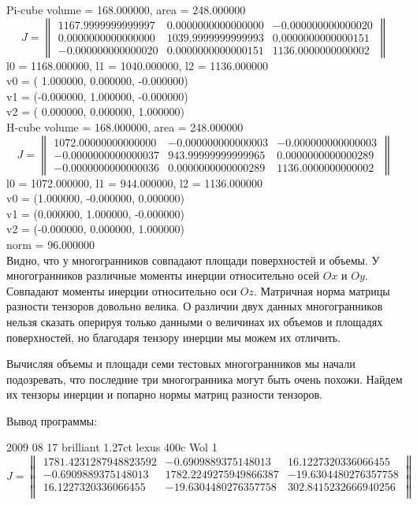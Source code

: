 \documentclass[a4paper,12pt, titlepage]{article}
\begin{document}
Pi-cube
volume = 168.000000, area = 248.000000
\[
J = 
\begin{Vmatrix}
1167.9999999999997	& 0.0000000000000000 &	-0.000000000000020	\\
0.0000000000000000	& 1039.9999999999993 &   0.0000000000000151	\\
-0.000000000000020	& 0.0000000000000151 &   1136.0000000000002	
\end{Vmatrix}
\]
l0 = 1168.000000, l1 = 1040.000000, l2 = 1136.000000\\
v0 = ( 1.000000,  0.000000, -0.000000)\\
v1 = (-0.000000,  1.000000, -0.000000)\\
v2 = ( 0.000000,  0.000000,  1.000000)\\


H-cube 
volume = 168.000000, area = 248.000000
\[
J = 
\begin{Vmatrix}
	1072.00000000000000	& -0.000000000000003 & -0.000000000000003	\\
	-0.0000000000000037	& 943.99999999999965 & 0.0000000000000289	\\
	-0.0000000000000036	& 0.0000000000000289 & 1136.0000000000002	
\end{Vmatrix}
\]
l0 = 1072.000000, l1 = 944.000000, l2 = 1136.000000\\
v0 = (1.000000, -0.000000, 0.000000)\\
v1 = (0.000000, 1.000000, -0.000000)\\
v2 = (-0.000000, 0.000000, 1.000000)\\

norm = 96.000000\\

Видно, что у многогранников совпадают площади поверхностей и объемы. У многогранников различные моменты инерции относительно 
осей $Ox$ и $Oy$. Совпадают  моменты инерции относительно оси $Oz$. Матричная норма матрицы разности тензоров довольно велика.
О различии двух данных многогранников нельзя сказать оперируя только данными о величинах  их объемов и площадях поверхностей,
но благодаря тензору инерции мы можем их отличить. 

Вычисляя объемы и площади семи тестовых многогранников мы начали подозревать, что последние три многогранника могут быть очень похожи. Найдем их тензоры инерции и попарно нормы матриц разности тензоров. \\
\newpage

Вывод программы:

2009 08 17 brilliant 1.27ct lexus 400c Wol 1
\[
J = 
\begin{Vmatrix}
1781.4231287948823592 &	-0.6909889375148013	& 16.1227320336066455	\\
-0.6909889375148013	& 1782.2249275949866387 & 	-19.6304480276357758	\\
16.1227320336066455	& -19.6304480276357758 & 	302.8415232666940256	\\
\end{Vmatrix}
\]
\end{document}
